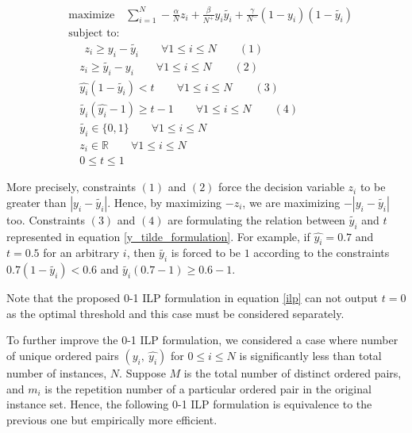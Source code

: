 \documentclass[a4paper, twocolumn]{article}
\begin{document}
\begin{equation}
\label{ilp}
\begin{aligned}
&\text{maximize} \quad \sum_{i=1}^{N} -\frac{\alpha}{N}z_i + \frac{\beta}{N^+} y_i \tilde{y_i} + \frac{\gamma}{N^-} (1-y_i) (1-\tilde{y_i})\\
&\text{subject to:}\\
&\quad \: \: z_i \ge y_i - \tilde{y_i} \qquad \forall 1\le i \le N \qquad (1)\\
& \quad z_i \ge \tilde{y_i}  - y_i \qquad \forall 1\le i \le N \qquad (2)\\
& \quad \hat{y_i} (1 - \tilde{y_i}) < t \qquad \forall 1\le i \le N \qquad (3)\\
& \quad  \tilde{y_i} (\hat{y_i} - 1) \ge t - 1 \qquad \forall 1\le i \le N \qquad (4)\\
& \quad \tilde{y_i} \in \{0, 1\} \qquad \forall 1\le i \le N \\
& \quad z_i \in \mathbb{R} \qquad \forall 1\le i \le N \\
& \quad  0 \le t \le 1
\end{aligned}
\end{equation}

More precisely, constraints $(1)$ and $(2)$ force the decision variable $z_i$ to be greater than $|y_i - \tilde{y_i}|$. Hence, by maximizing $-z_i$, we are maximizing $-|y_i - \tilde{y_i}|$ too. Constraints $(3)$ and $(4)$ are formulating the relation between $\tilde{y_i}$ and $t$ represented in equation \ref{y_tilde_formulation}. For example, if $\hat{y_i} = 0.7$ and $t=0.5$ for an arbitrary $i$, then $\tilde{y_i}$ is forced to be $1$ according to the constraints $0.7 (1 - \tilde{y_i}) < 0.6$ and $\tilde{y_i} (0.7 - 1) \ge 0.6 - 1$.

Note that the proposed 0-1 ILP formulation in equation \ref{ilp} can not output $t=0$ as the optimal threshold and this case must be considered separately. 

To further improve the 0-1 ILP formulation, we considered a case where number of unique ordered pairs $(y_i,\: \hat{y_i})$ for $0 \le i \le N$ is significantly less than total number of instances, $N$. Suppose $M$ is the total number of distinct ordered pairs, and $m_i$ is the repetition number of a particular ordered pair in the original instance set. Hence, the following 0-1 ILP formulation is equivalence to the previous one but empirically more efficient.
\end{document}
